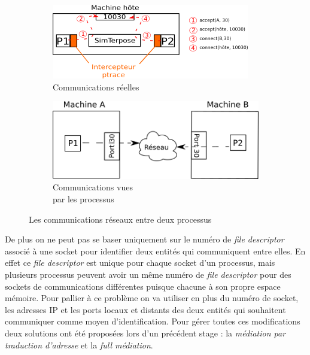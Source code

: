 \begin{figure}[H]
  \centering
  \begin{subfigure}{0.5\textwidth}
    \includegraphics[scale=0.8]{Pictures/png/Mediation_realite}
    \caption{Communications réelles}
  \label{COMM_REALITE}
  \end{subfigure}
  \begin{subfigure}{0.25\textwidth}
  \includegraphics[scale=0.5]{Pictures/png/Mediation_VM}
  \caption{Communications vues \\ par les processus}
  \label{COMM_VM}
  \end{subfigure}
  \caption{Les communications réseaux entre deux processus}
  \label{COMM}
\end{figure}

De plus on ne peut pas se baser uniquement sur le numéro de \textit{file
  descriptor} associé à une socket pour identifier deux entités qui communiquent
entre elles. En effet ce \textit{file descriptor} est unique pour chaque socket
d'un processus, mais plusieurs processus peuvent avoir un même numéro de
\textit{file descriptor} pour des sockets de communications différentes puisque
chacune à son propre espace mémoire. Pour pallier à ce problème on va utiliser
en plus du numéro de socket, les adresses IP et les ports locaux et distants des
deux entités qui souhaitent communiquer comme moyen d'identification. Pour gérer
toutes ces modifications deux solutions ont été proposées lors d'un précédent
stage \citep{GUILLAUME:Interceptionsyscall}: la \textit{médiation par traduction
  d'adresse} et la \textit{full médiation}.

